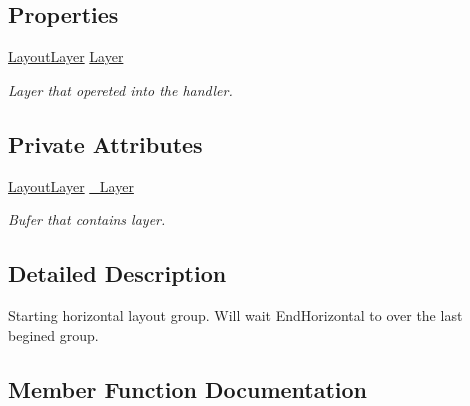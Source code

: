 \subsection*{Properties}
\begin{DoxyCompactItemize}
\item 
\mbox{\hyperlink{class_wpf_handler_1_1_u_i_1_1_auto_layout_1_1_layout_layer}{Layout\+Layer}} \mbox{\hyperlink{class_wpf_handler_1_1_u_i_1_1_auto_layout_1_1_configuration_1_1_begin_horizontal_group_attribute_afbdce9f3ac40b7f4bd6f2f675beafe36}{Layer}}
\begin{DoxyCompactList}\small\item\em Layer that opereted into the handler. \end{DoxyCompactList}\end{DoxyCompactItemize}
\subsection*{Private Attributes}
\begin{DoxyCompactItemize}
\item 
\mbox{\hyperlink{class_wpf_handler_1_1_u_i_1_1_auto_layout_1_1_layout_layer}{Layout\+Layer}} \mbox{\hyperlink{class_wpf_handler_1_1_u_i_1_1_auto_layout_1_1_configuration_1_1_begin_horizontal_group_attribute_af50995071c008ef3fff87aa189a8256f}{\+\_\+\+Layer}}
\begin{DoxyCompactList}\small\item\em Bufer that contains layer. \end{DoxyCompactList}\end{DoxyCompactItemize}


\subsection{Detailed Description}
Starting horizontal layout group. Will wait End\+Horizontal to over the last begined group. 



\subsection{Member Function Documentation}
\mbox{\label{class_wpf_handler_1_1_u_i_1_1_auto_layout_1_1_configuration_1_1_begin_horizontal_group_attribute_a8bb61f969389bece86c87fbfa44d4c82}} 
